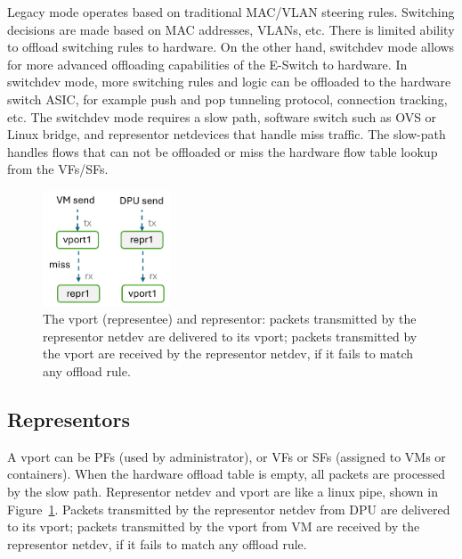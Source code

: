 \documentclass[letterpaper]{article}
\begin{document}
Legacy mode operates based on traditional MAC/VLAN steering rules. Switching
decisions are made based on MAC addresses, VLANs, etc. There is limited ability
to offload switching rules to hardware.
On the other hand, switchdev mode allows for more advanced offloading
capabilities of the E-Switch to hardware. In switchdev mode, more switching
rules and logic can be offloaded to the hardware switch ASIC, for example
push and pop tunneling protocol, connection tracking, etc.
The switchdev mode requires a slow path, software switch such as OVS or
Linux bridge, and representor netdevices that handle miss traffic.
The slow-path handles flows that can not be offloaded or miss the hardware
flow table lookup from the VFs/SFs.
\begin{figure}[t!]
\includegraphics[width=1.5in]{pipe.pdf}
\centering
\caption{The vport (representee) and representor: packets transmitted by the representor 
netdev are delivered to its vport; packets transmitted by the vport are
received by the representor netdev, if it fails to match any offload rule.}
\label{fig:pipe}
\end{figure}

\subsection{Representors}
A vport can be PFs (used by administrator), or VFs or SFs (assigned to VMs
or containers). When the hardware offload table is empty, all packets are 
processed by the slow path. Representor netdev and vport are like a linux
pipe, shown in Figure~\ref{fig:pipe}. Packets transmitted by the representor
netdev from DPU are delivered to its vport; packets transmitted by the vport
from VM are received by the representor netdev, if it fails to match any
offload rule.
\end{document}
